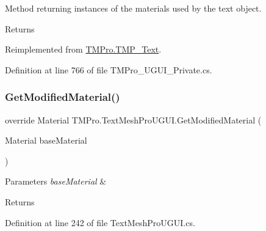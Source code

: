 Method returning instances of the materials used by the text object. 

\begin{DoxyReturn}{Returns}

\end{DoxyReturn}


Reimplemented from \mbox{\hyperlink{class_t_m_pro_1_1_t_m_p___text_a1979f92c718db50761d2773c9c724e81}{T\+M\+Pro.\+T\+M\+P\+\_\+\+Text}}.



Definition at line 766 of file T\+M\+Pro\+\_\+\+U\+G\+U\+I\+\_\+\+Private.\+cs.

\mbox{\label{class_t_m_pro_1_1_text_mesh_pro_u_g_u_i_ad9e0ee518fca96a5879709f7e2c378f1}} 
\subsubsection{\texorpdfstring{GetModifiedMaterial()}{GetModifiedMaterial()}}
{\footnotesize\ttfamily override Material T\+M\+Pro.\+Text\+Mesh\+Pro\+U\+G\+U\+I.\+Get\+Modified\+Material (\begin{DoxyParamCaption}\item[{Material}]{base\+Material }\end{DoxyParamCaption})}






\begin{DoxyParams}{Parameters}
{\em base\+Material} & \\
\hline
\end{DoxyParams}
\begin{DoxyReturn}{Returns}

\end{DoxyReturn}


Definition at line 242 of file Text\+Mesh\+Pro\+U\+G\+U\+I.\+cs.

\mbox{\label{class_t_m_pro_1_1_text_mesh_pro_u_g_u_i_a69bc3c5189896bbde641deefb4b76592}} 

